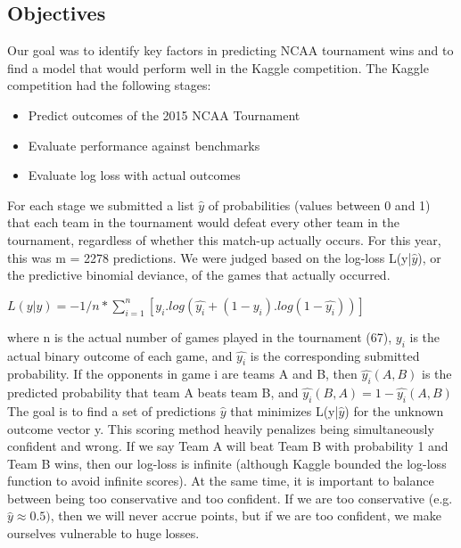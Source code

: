 \documentclass{article}
\newcommand{\drawTable}[1]{
	\noindent
	\scalebox{0.865}{
	    \pgfplotstabletypeset[
			col sep=comma,
			string type,
			column type={
				p{0.9\textwidth}
			},
			every head row/.style={
			        before row=\hline,
			        after row=\hline
		        },
			every last row/.style={
			        after row=\hline
		        },				
			display columns/0/.style={
				column type/.add={
					|p{.2\textwidth}|
				}{|}
			}
	    ]{#1}
	}
	\newline\newline\newline
}
\begin{document}
\begin{multicols}{2}
    \subsection{Objectives}
    Our goal was to identify key factors in predicting NCAA tournament wins and to find a
model that would perform well in the Kaggle competition.
The Kaggle competition had the following stages:
\begin{itemize}
\item Predict outcomes of the 2015 NCAA Tournament
\item Evaluate performance against benchmarks
\item Evaluate log loss with actual outcomes
\end{itemize}
    For each stage we submitted a list $\hat{y}$ of probabilities (values between 0 and 1) that each team in the tournament would defeat every other team in the tournament, regardless of whether this match-up actually occurs. For this year, this was m = 2278 predictions. We were judged based on the log-loss L(y|$\hat{y}$), or the predictive binomial deviance, of the games that actually occurred.
   
    \begin{center}
    $L(y|\hat{y}) = -1/n * \sum_{i=1}^{n}[y_i.log(\hat{y_i} + (1-y_i). log(1-\hat{y_i}))]$ 
    \end{center}
    
    where n is the actual number of games played in the tournament (67), $y_i$ is the actual binary outcome of each game, and $\hat{y_i}$ is the corresponding submitted probability. If the opponents in game i are teams A and B, then $\hat{y_i}(A,B)$ is the predicted probability that team A beats team B, and $\hat{y_i}(B,A)=1-\hat{y_i}(A,B)$
   \linebreak
   \linebreak
   The goal is to find a set of predictions $\hat{y}$ that minimizes L(y|$\hat{y}$) for the unknown outcome vector y. This scoring method heavily penalizes being simultaneously confident and wrong. If we say Team A will beat Team B with probability 1 and Team B wins, then our log-loss is infinite (although Kaggle bounded the log-loss function to avoid infinite scores). At the same time, it is important to balance between being too conservative and too confident. If we are too conservative (e.g. $\hat{y} \approx 0.5)$, then we will never accrue points, but if we are too confident, we make ourselves vulnerable to huge losses.\cite{1}
   \newline

	\end{multicols}  	
	\drawTable{table_1_data.csv}
			    
\end{document}
